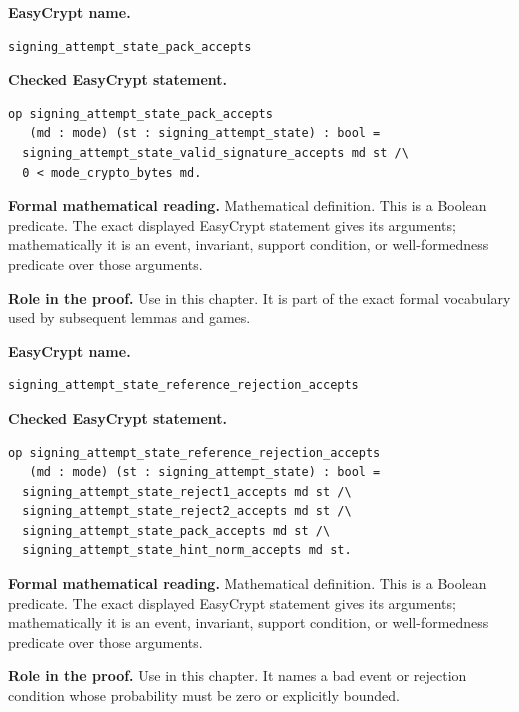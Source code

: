\begin{formaldefinition}
\noindent\textbf{EasyCrypt name.}
\begin{lstlisting}[language=EasyCrypt,basicstyle=\ttfamily\scriptsize]
signing_attempt_state_pack_accepts
\end{lstlisting}
\noindent\textbf{Checked EasyCrypt statement.}
\begin{lstlisting}[language=EasyCrypt,basicstyle=\ttfamily\scriptsize]
op signing_attempt_state_pack_accepts
   (md : mode) (st : signing_attempt_state) : bool =
  signing_attempt_state_valid_signature_accepts md st /\
  0 < mode_crypto_bytes md.
\end{lstlisting}
\noindent\textbf{Formal mathematical reading.}
Mathematical definition. This is a Boolean predicate.  The exact displayed EasyCrypt statement gives its arguments; mathematically it is an event, invariant, support condition, or well-formedness predicate over those arguments.

\noindent\textbf{Role in the proof.}
Use in this chapter. It is part of the exact formal vocabulary used by subsequent lemmas and games.

\end{formaldefinition}

\begin{formaldefinition}
\noindent\textbf{EasyCrypt name.}
\begin{lstlisting}[language=EasyCrypt,basicstyle=\ttfamily\scriptsize]
signing_attempt_state_reference_rejection_accepts
\end{lstlisting}
\noindent\textbf{Checked EasyCrypt statement.}
\begin{lstlisting}[language=EasyCrypt,basicstyle=\ttfamily\scriptsize]
op signing_attempt_state_reference_rejection_accepts
   (md : mode) (st : signing_attempt_state) : bool =
  signing_attempt_state_reject1_accepts md st /\
  signing_attempt_state_reject2_accepts md st /\
  signing_attempt_state_pack_accepts md st /\
  signing_attempt_state_hint_norm_accepts md st.
\end{lstlisting}
\noindent\textbf{Formal mathematical reading.}
Mathematical definition. This is a Boolean predicate.  The exact displayed EasyCrypt statement gives its arguments; mathematically it is an event, invariant, support condition, or well-formedness predicate over those arguments.

\noindent\textbf{Role in the proof.}
Use in this chapter. It names a bad event or rejection condition whose probability must be zero or explicitly bounded.

\end{formaldefinition}

